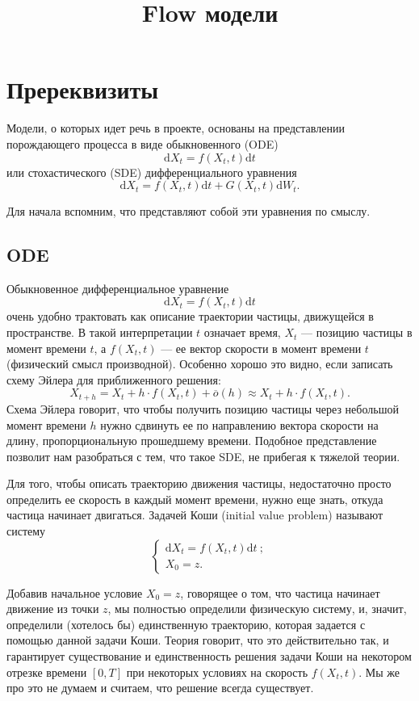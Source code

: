\documentclass[12pt]{article}
\title{Flow модели}
\theoremstyle{definition}
\begin{document}
\date{}
\maketitle
\tableofcontents
\newpage

\section{Пререквизиты}


Модели, о которых идет речь в проекте, основаны на представлении порождающего процесса в виде обыкновенного (ODE)
\[
    \mathrm{d} X_t = f(X_t, t) \mathrm{d} t
\]
или стохастического (SDE) дифференциального уравнения
\[
    \mathrm{d} X_t = f(X_t, t) \mathrm{d} t + G(X_t, t) \mathrm{d} W_t.
\]

Для начала вспомним, что представляют собой эти уравнения по смыслу. 

\subsection{ODE}
Обыкновенное дифференциальное уравнение 
\[
    \mathrm d X_t = f(X_t, t) \mathrm{d} t
\]
очень удобно трактовать как описание траектории частицы, движущейся в пространстве. В такой интерпретации $t$ означает время, $X_t$ --- позицию частицы в момент времени $t$, а $f(X_t, t)$ --- ее вектор скорости в момент времени $t$ (физический смысл производной). Особенно хорошо это видно, если записать схему Эйлера для приближенного решения:
\[
    X_{t + h} = X_t + h \cdot f(X_t, t) + \overline{o}(h) \approx X_t + h \cdot f(X_t, t).
\]
Схема Эйлера говорит, что чтобы получить позицию частицы через небольшой момент времени $h$ нужно сдвинуть ее по направлению вектора скорости на длину, пропорциональную прошедшему времени. Подобное представление позволит нам разобраться с тем, что такое SDE, не прибегая к тяжелой теории.

Для того, чтобы описать траекторию движения частицы, недостаточно просто определить ее скорость в каждый момент времени, нужно еще знать, откуда частица начинает двигаться. Задачей Коши (initial value problem) называют систему
\[
    \begin{cases}
        \mathrm{d} X_t = f(X_t, t) \mathrm{d} t\:;\\
        X_0 = z.
    \end{cases}
\]

Добавив начальное условие $X_0 = z$, говорящее о том, что частица начинает движение из точки $z$, мы полностью определили физическую систему, и, значит, определили (хотелось бы) единственную траекторию, которая задается с помощью данной задачи Коши. Теория говорит, что это действительно так, и гарантирует существование и единственность решения задачи Коши на некотором отрезке времени $[0, T]$ при некоторых условиях на скорость $f(X_t, t)$. Мы же про это не думаем и считаем, что решение всегда существует.
\end{document}
